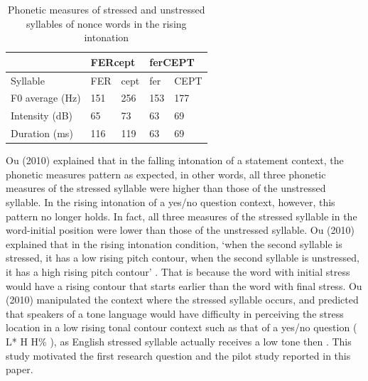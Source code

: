 \documentclass[a4paper]{article}
\begin{document}
\begin{table}[!h]
  \begin{center}
      \caption{Phonetic measures of stressed and unstressed syllables of nonce words in the rising intonation}
\begin{tabular}{lllll}
    \label{tab:table4}
              & \multicolumn{2}{l}{FERcept} & \multicolumn{2}{l}{ferCEPT}  \\ \hline
 Syllable & FER          & cept          &   fer          &      CEPT        \\ \hline
F0 average (Hz) & 151          & 256          &   153           &      177         \\ \hline
Intensity (dB)    & 65           & 73         &      63        &         69    \\ \hline
Duration (ms)     & 116          & 119        &       63      &      69
\end{tabular}
\end{center}
\end{table}

Ou (2010) explained that in the falling intonation of a statement context, the phonetic measures pattern as expected, in other words, all three phonetic measures of the stressed syllable were higher than those of the unstressed syllable. In the rising intonation of a yes/no question context, however, this pattern no longer holds. In fact, all three measures of the stressed syllable in the word-initial position were lower than those of the unstressed syllable. Ou (2010) explained that in the rising intonation condition, `when the second syllable is stressed, it has a low rising pitch contour, when the second syllable is unstressed, it has a high rising pitch contour' \cite{Ou:2010aa}. That is because the word with initial stress would have a rising contour that starts earlier than the word with final stress. Ou (2010) manipulated the context where the stressed syllable occurs, and predicted that speakers of a tone language would have difficulty in perceiving the stress location in a low rising tonal contour context such as that of a yes/no question ( L* H H\% ), as English stressed syllable actually receives a low tone then \cite{Ou:2010aa}. This study motivated the first research question and the pilot study reported in this paper.
\end{document}
